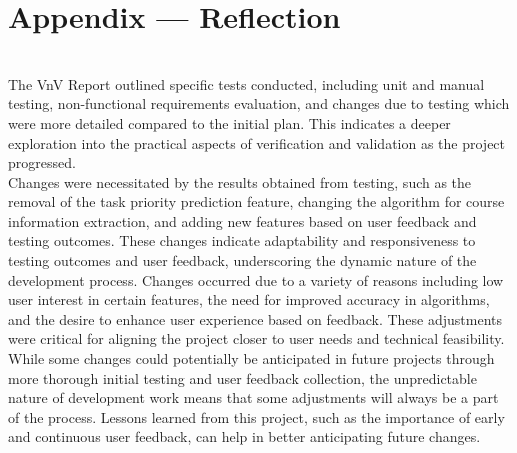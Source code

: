 \documentclass[12pt, titlepage]{article}
\begin{document}
\newpage{}
\section*{Appendix --- Reflection}

\\
The VnV Report outlined specific tests conducted, including unit and manual testing, non-functional requirements evaluation, and changes due to testing which were more detailed compared to the initial plan. This indicates a deeper exploration into the practical aspects of verification and validation as the project progressed. \\
Changes were necessitated by the results obtained from testing, such as the removal of the task priority prediction feature, changing the algorithm for course information extraction, and adding new features based on user feedback and testing outcomes. These changes indicate adaptability and responsiveness to testing outcomes and user feedback, underscoring the dynamic nature of the development process. Changes occurred due to a variety of reasons including low user interest in certain features, the need for improved accuracy in algorithms, and the desire to enhance user experience based on feedback. These adjustments were critical for aligning the project closer to user needs and technical feasibility.\\
While some changes could potentially be anticipated in future projects through more thorough initial testing and user feedback collection, the unpredictable nature of development work means that some adjustments will always be a part of the process. Lessons learned from this project, such as the importance of early and continuous user feedback, can help in better anticipating future changes.

\newpage

\newpage
\end{document}
